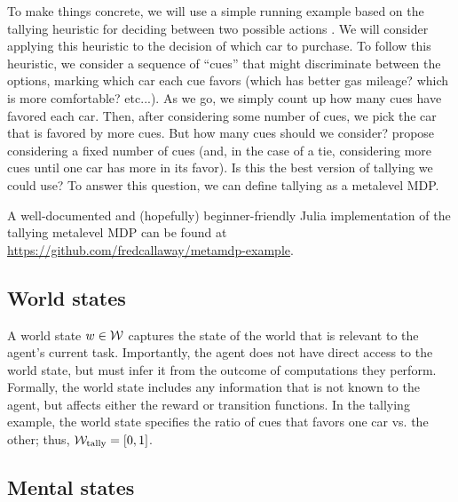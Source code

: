 To make things concrete, we will use a simple running example based on the tallying heuristic for deciding between two possible actions \citep{gigerenzer2011heuristic}. We will consider applying this heuristic to the decision of which car to purchase. To follow this heuristic, we consider a sequence of ``cues'' that might discriminate between the options, marking which car each cue favors (which has better gas mileage? which is more comfortable? etc...). As we go, we simply count up how many cues have favored each car. Then, after considering some number of cues, we pick the car that is favored by more cues. But how many cues should we consider? \citeauthor{gigerenzer2011heuristic} propose considering a fixed number of cues (and, in the case of a tie, considering more cues until one car has more in its favor). Is this the best version of tallying we could use? To answer this question, we can define tallying as a metalevel MDP.

A well-documented and (hopefully) beginner-friendly Julia implementation of the tallying metalevel MDP can be found at \url{https://github.com/fredcallaway/metamdp-example}.

\subsection{World states}
A world state $w \in \mathcal{W}$ captures the state of the world that is relevant to the agent's current task. Importantly, the agent does not have direct access to the world state, but must infer it from the outcome of computations they perform. Formally, the world state includes any information that is not known to the agent, but affects either the reward or transition functions. In the tallying example, the world state specifies the ratio of cues that favors one car vs. the other; thus, $\mathcal{W}_{\text{tally}} = [0, 1]$. 



\subsection{Mental states}

